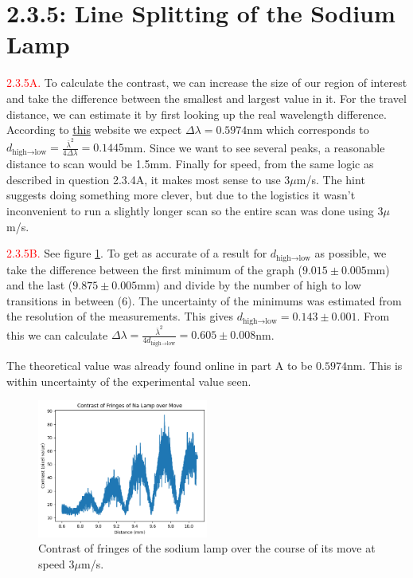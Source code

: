 \documentclass[letterpaper, reqno,11pt]{article}
\begin{document}
\section{2.3.5: Line Splitting of the Sodium Lamp}

\noindent \textcolor{red}{2.3.5A.} To calculate the contrast, we can increase the size of our region of interest and take the difference between the smallest and largest value in it. For the travel distance, we can estimate it by first looking up the real wavelength difference. According to \href{http://hyperphysics.phy-astr.gsu.edu/hbase/phyopt/Na.html}{this} website we expect $\Delta\lambda=0.5974$nm which corresponds to $d_{\text{high}\to\text{low}}=\frac{\bar \lambda^2}{4\Delta\lambda}=0.1445$mm. Since we want to see several peaks, a reasonable distance to scan would be 1.5mm. Finally for speed, from the same logic as described in question 2.3.4A, it makes most sense to use $3\mu$m/s. The hint suggests doing something more clever, but due to the logistics it wasn't inconvenient to run a slightly longer scan so the entire scan was done using $3\mu$m/s.

\noindent \textcolor{red}{2.3.5B.} See figure \ref{fig:5B}. To get as accurate of a result for $d_{\text{high}\to\text{low}}$ as possible, we take the difference between the first minimum of the graph ($9.015\pm 0.005$mm) and the last ($9.875\pm 0.005$mm) and divide by the number of high to low transitions in between (6). The uncertainty of the minimums was estimated from the resolution of the measurements. This gives $d_{\text{high}\to\text{low}}=0.143\pm 0.001$. From this we can calculate $\Delta\lambda=\frac{\bar \lambda^2}{4d_{\text{high}\to\text{low}}}=0.605\pm 0.008$nm.

The theoretical value was already found online in part A to be $0.5974$nm. This is within uncertainty of the experimental value seen.

\begin{figure}[htpb]
    \centering
    \includegraphics[width=0.5\textwidth]{5B}
    \caption{Contrast of fringes of the sodium lamp over the course of its move at speed $3\mu$m/s. }
    \label{fig:5B}
\end{figure}
\end{document}
